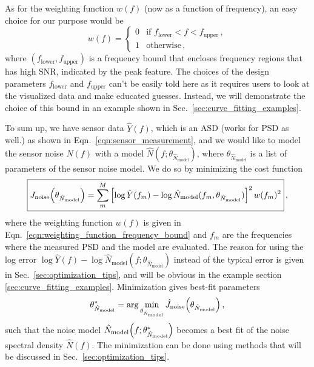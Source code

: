 As for the weighting function $w(f)$ (now as a function of frequency), an easy choice for our purpose would be
\begin{equation}
	w(f)=
	\begin{cases}
		0 &\text{if } f_\mathrm{lower}<f<f_\mathrm{upper}\,,\\
		1 &\text{otherwise}\,,
	\end{cases}
	\label{eqn:weighting_function_frequency_bound}
\end{equation}
where $\left(f_\mathrm{lower},f_\mathrm{upper}\right)$ is a frequency bound that encloses frequency regions that has high SNR, indicated by the peak feature.
The choices of the design parameters $f_\mathrm{lower}$ and $f_\mathrm{upper}$ can't be easily told here as it requires users to look at the visualized data and make educated guesses.
Instead, we will demonstrate the choice of this bound in an example shown in Sec.~\ref{sec:curve_fitting_examples}.

To sum up, we have sensor data $\hat{Y}(f)$, which is an ASD (works for PSD as well.) as shown in Eqn.~\eqref{eqn:sensor_measurement}, and we would like to model the sensor noise $\hat{N}(f)$ with a model $\hat{N}(f;\theta_{\hat{N}_\mathrm{model}})$, where $\theta_{\hat{N}_\mathrm{model}}$ is a list of parameters of the sensor noise model.
We do so by minimizing the cost function
\begin{equation}
	\boxed{
		J_\mathrm{noise}\mleft(\theta_{\hat{N}_\mathrm{model}}\mright)=\sum_m^M\left[\log\hat{Y}(f_m)-\log\hat{N}_\mathrm{model}(f_m, \theta_{\hat{N}_\mathrm{model}})\right]^2 w(f_m)^2
	}\,,
	\label{eqn:noise_cost_function}
\end{equation}
where the weighting function $w(f)$ is given in Eqn.~\eqref{eqn:weighting_function_frequency_bound} and $f_m$ are the frequencies where the measured PSD and the model are evaluated.
The reason for using the log error $\log\hat{Y}(f) - \log\hat{N}_\mathrm{model}(f;\theta_{\hat{N}_\mathrm{model}})$ instead of the typical error is given in Sec.~\ref{sec:optimization_tips}, and will be obvious in the example section \ref{sec:curve_fitting_examples}.
Minimization gives best-fit parameters
\begin{equation}
	\theta_{\hat{N}_\mathrm{model}}^*=\arg\min_{\theta_{\hat{N}_\mathrm{model}}} \hat{J}_\mathrm{noise}\mleft(\theta_{\hat{N}_\mathrm{model}}\mright)\,,
\end{equation} such that the noise model $\hat{N}_\mathrm{model}\mleft(f;\theta_{\hat{N}_\mathrm{model}}^*\mright)$ becomes a best fit of the noise spectral density $\hat{N}(f)$.
The minimization can be done using methods that will be discussed in Sec.~\ref{sec:optimization_tips}.

